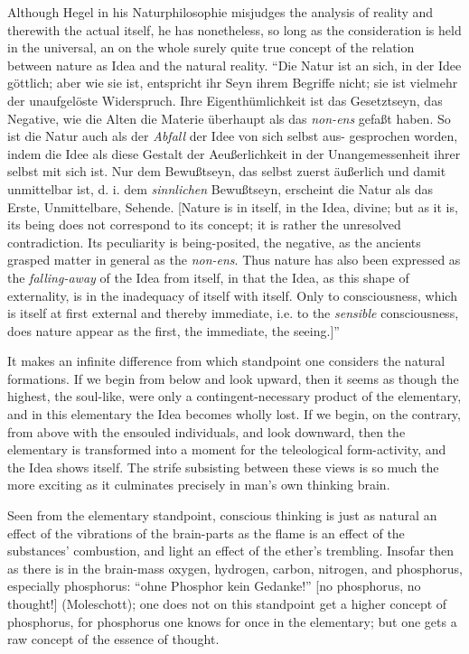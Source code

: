 \documentclass[12pt]{book}
\begin{document}
Although Hegel in his Naturphilosophie misjudges the analysis of reality and therewith the actual itself,
he has nonetheless, so long as the consideration is held in the universal, an on the whole surely quite
true concept of the relation between nature as Idea and the natural reality. ``Die Natur ist an sich, in der
Idee göttlich; aber wie sie ist, entspricht ihr Seyn ihrem Begriffe nicht; sie ist vielmehr der unaufgelöste
Widerspruch. Ihre Eigenthümlichkeit ist das Gesetztseyn, das Negative, wie die Alten die Materie überhaupt
als das \textit{non-ens} gefaßt haben. So ist die Natur auch als der \emph{Abfall} der Idee von sich selbst
aus-
gesprochen worden, indem die Idee als diese Gestalt der Aeußerlichkeit in der Unangemessenheit ihrer selbst
mit sich ist. Nur dem Bewußtseyn, das selbst zuerst äußerlich und damit unmittelbar ist, d. i. dem
\emph{sinnlichen} Bewußtseyn, erscheint die Natur als das Erste, Unmittelbare, Sehende. [Nature is in
itself, in the Idea, divine; but as it is, its being does not correspond to its concept; it is rather the
unresolved contradiction. Its peculiarity is being-posited, the negative, as the ancients grasped matter in
general as the \textit{non-ens}. Thus nature has also been expressed as the \emph{falling-away} of the Idea
from itself, in that the Idea, as this shape of externality, is in the inadequacy of itself with itself.
Only to consciousness, which is itself at first external and thereby immediate, i.e. to the \emph{sensible}
consciousness, does nature appear as the first, the immediate, the seeing.]''

It makes an infinite difference from which standpoint one considers the natural formations. If we begin from
below and look upward, then it seems as though the highest, the soul-like, were only a
contingent-necessary product of the elementary, and in this elementary the Idea becomes wholly lost. If we
begin, on the contrary, from above with the ensouled individuals, and look downward, then the elementary is
transformed into a moment for the teleological form-activity, and the Idea shows itself. The strife
subsisting between these views is so much the more exciting as it culminates precisely in man's own thinking
brain.

Seen from the elementary standpoint, conscious thinking is just as natural an effect of the vibrations of
the brain-parts as the flame is an effect of the substances' combustion, and light an effect of the ether's
trembling. Insofar then as there is in the brain-mass oxygen, hydrogen, carbon, nitrogen, and phosphorus,
especially phosphorus: ``ohne Phosphor kein Gedanke!'' [no phosphorus, no thought!] (Moleschott); one does
not on this standpoint get a higher concept of phosphorus, for phosphorus one knows for once in the
elementary; but one gets a raw concept of the essence of thought.
\end{document}
